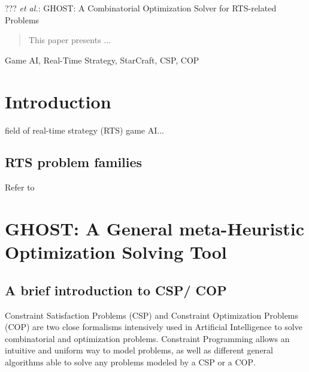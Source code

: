 \documentclass[journal]{IEEEtran}
\newcommand{\csp}{\textsc{CSP}\xspace}
\newcommand{\cop}{\textsc{COP}\xspace}
\newcommand{\ghost}{\textsc{GHOST}\xspace}
\begin{document}
%
{??? \MakeLowercase{\textit{et al.}}: \ghost: A Combinatorial Optimization Solver for RTS-related Problems}

\maketitle

\begin{abstract}
This paper presents ...
\end{abstract}

\begin{IEEEkeywords}
Game AI, Real-Time Strategy, StarCraft, CSP, COP

\end{IEEEkeywords}

%
\IEEEpeerreviewmaketitle

\section{Introduction}\label{sec:intro}
 field of real-time strategy (RTS) game AI...

\subsection{RTS problem families}
Refer to \cite{OntanonSURCM13}


\section{\ghost: A General meta-Heuristic Optimization Solving Tool}\label{sec:ghost}
\subsection{A brief introduction to \csp / \cop}

Constraint  Satisfaction Problems  (\csp) and  Constraint Optimization
Problems  (\cop)   are  two  close  formalisms   intensively  used  in
Artificial  Intelligence  to   solve  combinatorial  and  optimization
problems. Constraint  Programming allows an intuitive  and uniform way
to model  problems, as  well as different  general algorithms  able to
solve any problems modeled by a \csp or a \cop.
\end{document}
